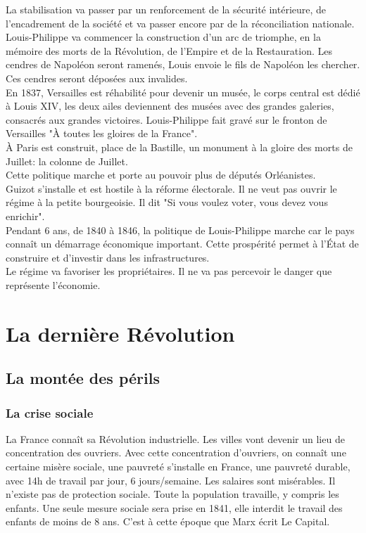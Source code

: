 \documentclass[10pt, a4paper, openany]{book}
\begin{document}
La stabilisation va passer par un renforcement de la sécurité intérieure, de l'encadrement de la société et va passer encore par de la réconciliation nationale. Louis-Philippe va commencer la construction d'un arc de triomphe, en la mémoire des morts de la Révolution, de l'Empire et de la Restauration. Les cendres de Napoléon seront ramenés, Louis envoie le fils de Napoléon les chercher. Ces cendres seront déposées aux invalides. \\
En 1837, Versailles est réhabilité pour devenir un musée, le corps central est dédié à Louis XIV, les deux ailes deviennent des musées avec des grandes galeries, consacrés aux grandes victoires. Louis-Philippe fait gravé sur le fronton de Versailles "À toutes les gloires de la France". \\
À Paris est construit, place de la Bastille, un monument à la gloire des morts de Juillet: la colonne de Juillet. \\
Cette politique marche et porte au pouvoir plus de députés Orléanistes. \\
Guizot s'installe et est hostile à la réforme électorale. Il ne veut pas ouvrir le régime à la petite bourgeoisie. Il dit "Si vous voulez voter, vous devez vous enrichir". \\
Pendant 6 ans, de 1840 à 1846, la politique de Louis-Philippe marche car le pays connaît un démarrage économique important. Cette prospérité permet à l'État de construire et d'investir dans les infrastructures. \\
Le régime va favoriser les propriétaires. Il ne va pas percevoir le danger que représente l'économie. 


\section{La dernière Révolution}

\subsection{La montée des périls}

\subsubsection{La crise sociale}

La France connaît sa Révolution industrielle. Les villes vont devenir un lieu de concentration des ouvriers. Avec cette concentration d'ouvriers, on connaît une certaine misère sociale, une pauvreté s'installe en France, une pauvreté durable, avec 14h de travail par jour, 6 jours/semaine. Les salaires sont misérables. Il n'existe pas de protection sociale. Toute la population travaille, y compris les enfants. Une seule mesure sociale sera prise en 1841, elle interdit le travail des enfants de moins de 8 ans. C'est à cette époque que Marx écrit Le Capital. 
\end{document}
